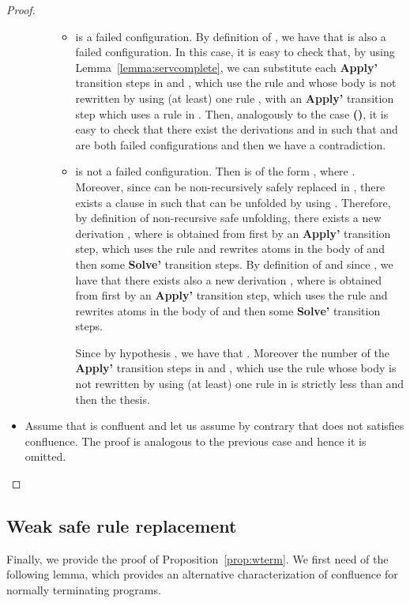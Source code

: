 \documentclass{tlp}
\begin{document}
\begin{proof}
\begin{itemize}
\begin{description}
    \begin{itemize}
      \item  is a failed configuration. By definition of , we have that  is also a failed configuration. In this case, it is easy to check that, by using Lemma~\ref{lemma:servcomplete}, we can substitute each {\bf Apply'} transition steps in  and , which use the rule  and whose body is not rewritten by using (at least) one rule , with an {\bf Apply'} transition step which uses a rule in . Then, analogously to the case {\bf ()}, it is easy to check that there exist the derivations  and  in  such that  and  are both failed configurations and then we have a contradiction.

\item   is not a failed configuration. Then  is of the form , where .
    Moreover, since  can be non-recursively safely replaced in , there exists a clause  in   such that
     can be unfolded by using . Therefore, by definition of non-recursive safe unfolding,
    there exists a new derivation , where  is obtained from   first by an
     {\bf Apply'} transition step, which uses the rule  and rewrites atoms in the body of  and then some {\bf Solve'} transition steps.
     By definition of  and since , we have that there exists also a new derivation
     , where  is obtained from   first by an
     {\bf Apply'} transition step, which uses the rule  and rewrites atoms in the body of  and then some {\bf Solve'} transition steps.

 Since by hypothesis , we have that . Moreover the number of the {\bf Apply'} transition steps in  and , which use the rule  whose body is not rewritten by using (at least) one rule in 
     is strictly less than  and then the thesis.
     \end{itemize}
   \end{description}
    \item Assume that  is confluent and let us assume by contrary that   does not satisfies confluence. The proof is analogous to the previous case and hence it is omitted.
\end{itemize}
\end{proof}



\subsection{Weak safe rule replacement}


Finally, we provide the proof of Proposition~\ref{prop:wterm}. We first need of the following lemma, which provides an alternative characterization of confluence for normally terminating programs.
\end{document}
